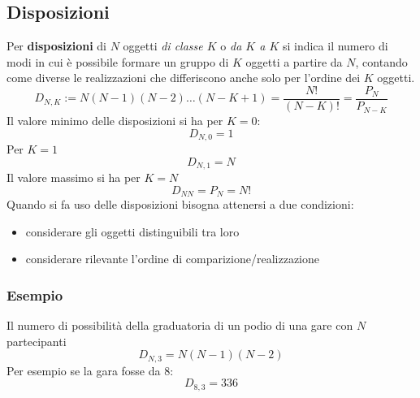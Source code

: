 \documentclass[11pt,a4paper]{book}
\begin{document}
\subsection{Disposizioni} 
Per \textbf{disposizioni} di $ N $ oggetti \textit{di classe $ K $} o \textit{da $ K $ a $ K $} si indica il numero di modi in cui è possibile formare un gruppo di $ K $ oggetti a partire da $ N $, contando come diverse le realizzazioni che differiscono anche solo per l'ordine dei $ K $ oggetti.
\begin{equation}
D_{N,K} := N(N-1)(N-2)\dots (N-K+1) = \frac{N!}{(N-K)!} = \frac{P_N}{P_{N-K}}
\end{equation}
Il valore minimo delle disposizioni si ha per $ K = 0 $:
\begin{equation}
D_{N,0} = 1
\end{equation}
Per $ K = 1 $
\begin{equation}
D_{N,1} = N
\end{equation}
Il valore massimo si ha per $ K = N $
\begin{equation}
D_{NN} = P_N = N!
\end{equation}
Quando si fa uso delle disposizioni bisogna attenersi a due condizioni:
\begin{itemize}
\item considerare gli oggetti distinguibili tra loro
\item considerare rilevante l'ordine di comparizione/realizzazione
\end{itemize}
\subsubsection{Esempio}
Il numero di possibilità della graduatoria di un podio di una gare con $ N $ partecipanti
\begin{equation}
D_{N,3} = N(N-1)(N-2)
\end{equation}
Per esempio se la gara fosse da $ 8 $:
\begin{equation}
D_{8,3} = 336
\end{equation}
\end{document}
